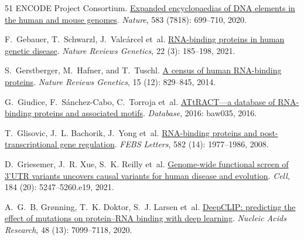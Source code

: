 \begin{thebibliography}{51}
{ENCODE Project Consortium}.
\newblock \href{https://doi.org/10.1038/s41586-020-2493-4}{Expanded
  encyclopaedias of {DNA} elements in the human and mouse genomes}.
\newblock \emph{Nature}, 583 (7818): 699--710, 2020.

F.~Gebauer, T.~Schwarzl, J.~Valc{\'a}rcel et~al.
\newblock \href{https://doi.org/10.1038/s41576-020-00302-y}{RNA-binding
  proteins in human genetic disease}.
\newblock \emph{Nature Reviews Genetics}, 22 (3): 185--198,
  2021.

S.~Gerstberger, M.~Hafner, and T.~Tuschl.
\newblock \href{https://doi.org/10.1038/nrg3813}{A census of human RNA-binding
  proteins}.
\newblock \emph{Nature Reviews Genetics}, 15 (12): 829--845,
  2014.

G.~Giudice, F.~S{\'a}nchez-Cabo, C.~Torroja et~al.
\newblock \href{https://doi.org/10.1093/database/baw035}{{ATtRACT}---a database
  of {RNA}-binding proteins and associated motifs}.
\newblock \emph{Database}, 2016: baw035, 2016.

T.~Glisovic, J.~L. Bachorik, J.~Yong et~al.
\newblock \href{https://doi.org/10.1016/j.febslet.2008.03.004}{RNA-binding
  proteins and post-transcriptional gene regulation}.
\newblock \emph{FEBS Letters}, 582 (14): 1977--1986, 2008.

D.~Griesemer, J.~R. Xue, S.~K. Reilly et~al.
\newblock \href{https://doi.org/10.1016/j.cell.2021.08.025}{Genome-wide
  functional screen of {3'UTR} variants uncovers causal variants for human
  disease and evolution}.
\newblock \emph{Cell}, 184 (20): 5247--5260.e19, 2021.

A.~G.~B. Gr{\o}nning, T.~K. Doktor, S.~J. Larsen et~al.
\newblock \href{https://doi.org/10.1093/nar/gkaa530}{{DeepCLIP}: predicting the
  effect of mutations on protein--{RNA} binding with deep learning}.
\newblock \emph{Nucleic Acids Research}, 48 (13): 7099--7118,
  2020.


\end{thebibliography}
